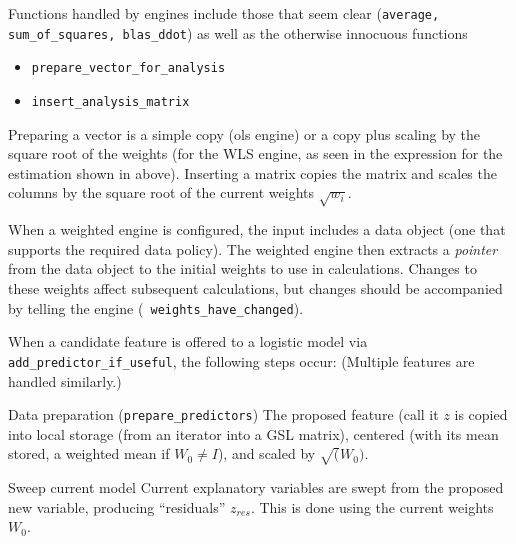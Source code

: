 \documentclass[12pt]{article}
\begin{document}
 Functions handled by engines include those that seem clear ({\tt average,
 sum\_of\_squares, blas\_ddot}) as well as the otherwise innocuous functions
\begin{itemize}
  \item {\tt prepare\_vector\_for\_analysis}
  \item {\tt insert\_analysis\_matrix}
\end{itemize}
 Preparing a vector is a simple copy (ols engine) or a copy plus scaling by the
 square root of the weights (for the WLS engine, as seen in the expression for
 the estimation shown in  above).  Inserting a matrix copies the
 matrix and scales the columns by the square root of the current weights
 $\sqrt{w_i}$.


 When a weighted engine is configured, the input includes a data object (one
 that supports the required data policy).  The weighted engine then extracts a
 {\em pointer} from the data object to the initial weights to use in
 calculations.  Changes to these weights affect subsequent calculations, but
 changes should be accompanied by telling the engine ({\tt
 weights\_have\_changed}).


 When a candidate feature is offered to a logistic model via {\tt
 add\_predictor\_if\_useful}, the following steps occur: (Multiple features are
 handled similarly.)
\begin{description}
 \item{Data preparation} ({\tt prepare\_predictors}) The proposed feature (call
 it $z$ is copied into local storage (from an iterator into a GSL matrix),
 centered (with its mean stored, a weighted mean if $W_0 \ne I$), and scaled by
 $\sqrt(W_0)$.
 \item{Sweep current model} Current explanatory variables are swept from the
 proposed new variable, producing ``residuals'' $z_{res}$.  This is done using
 the current weights $W_0$.
\end{description}
\end{document}
